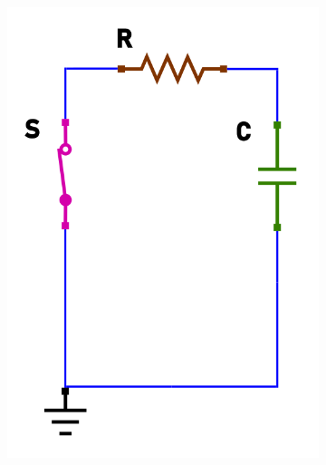 \documentclass[12pt]{article}
\begin{document}
\begin{figure}[h!]
\begin{subfigure}[b]{0.3\linewidth}
    \includegraphics[width=\linewidth]{data/scarica-closed.png}
  \end{subfigure}
  \begin{subfigure}[b]{0.347\linewidth}

\end{subfigure}
\end{figure}
\end{document}
